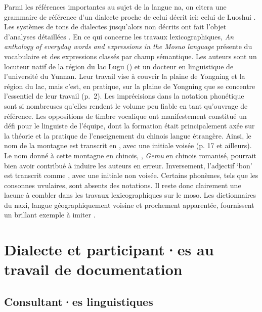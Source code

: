 Parmi les références importantes au sujet de la langue na, on citera une grammaire de référence d'un dialecte proche de celui décrit ici: celui de Luoshui  \parencite{lidz2010}. Les systèmes de tons de dialectes jusqu'alors non décrits ont fait l'objet d'analyses détaillées \parencite{a2016,dobbsetal2016,michaud2017,fily_documentation_2022}. En ce qui concerne les travaux lexicographiques, \emph{An anthology of everyday words and expressions in the Mosuo language} \parencite{zhibaetal2013} présente du vocabulaire et des expressions classés par champ sémantique. Les auteurs sont un locuteur natif de la région du lac Lugu () et un docteur en linguistique de l'université du Yunnan. Leur travail vise à couvrir la plaine de Yongning et la région du lac, mais c'est, en pratique, sur la plaine de Yongning que se concentre l'essentiel de leur travail (p.~2). Les imprécisions dans la notation phonétique sont si nombreuses qu'elles rendent le volume peu fiable en tant qu'ouvrage de référence. Les oppositions de timbre vocalique ont manifestement constitué un défi pour le linguiste de l'équipe, dont la formation était principalement axée sur la théorie et la pratique de l'enseignement du chinois langue étrangère. Ainsi, le nom de la montagne  est transcrit en , avec une initiale voisée (p. 17 et ailleurs). Le nom donné à cette montagne en chinois, , \emph{Gemu} en chinois romanisé, pourrait bien avoir contribué à induire les auteurs en erreur. Inversement, l'adjectif  `bon' est transcrit comme , avec une initiale non voisée. Certains phonèmes, tels que les consonnes uvulaires, sont absents des notations. Il reste donc clairement une lacune à combler dans les travaux lexicographiques sur le moso. Les dictionnaires du naxi, langue géographiquement voisine et prochement apparentée, fournissent un brillant exemple à imiter \parencite{heetal2011,pinsonetal2012}.

\section{Dialecte et participant·es au travail de documentation}
\label{sec:dialect}

\subsection{Consultant·es linguistiques}

